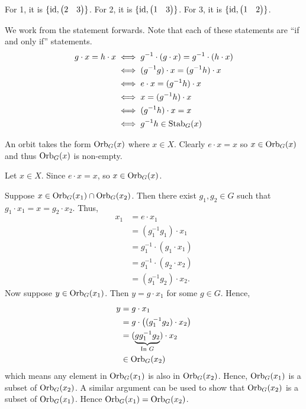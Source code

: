 \begin{questions}
    \item For 1, it is $\{\mathrm{id}, \begin{pmatrix}2 & 3\end{pmatrix}\}$. For 2, it is $\{\mathrm{id}, \begin{pmatrix}1 & 3\end{pmatrix}\}$. For 3, it is $\{\mathrm{id}, \begin{pmatrix}1 & 2\end{pmatrix}\}$.

    \item We work from the statement forwards. Note that each of these statements are ``if and only if'' statements.
    \begin{align*}
        g \cdot x = h \cdot x &\iff g^{-1} \cdot (g \cdot x) = g^{-1} \cdot (h \cdot x)\\
        &\iff (g^{-1}g) \cdot x = (g^{-1}h) \cdot x\\
        &\iff e \cdot x = (g^{-1}h) \cdot x\\
        &\iff x = (g^{-1}h) \cdot x\\
        &\iff (g^{-1}h) \cdot x = x\\
        &\iff g^{-1}h \in \mathrm{Stab}_{G}(x)
    \end{align*}

    \item \begin{partquestions}{\alph*}
        \item An orbit takes the form $\mathrm{Orb}_{G}(x)$ where $x \in X$. Clearly $e \cdot x = x$ so $x \in \mathrm{Orb}_{G}(x)$ and thus $\mathrm{Orb}_{G}(x)$ is non-empty.
        \item Let $x \in X$. Since $e \cdot x = x$, so $x \in \mathrm{Orb}_{G}(x)$.
        \item Suppose $x \in \mathrm{Orb}_{G}(x_1) \cap \mathrm{Orb}_{G}(x_2)$. Then there exist $g_1, g_2 \in G$ such that $g_1\cdot x_1 = x = g_2\cdot x_2$. Thus,
        \begin{align*}
            x_1 &= e \cdot x_1\\
            &= (g_1^{-1}g_1)\cdot x_1\\
            &= g_1^{-1} \cdot (g_1 \cdot x_1)\\
            &= g_1^{-1} \cdot (g_2 \cdot x_2)\\
            &= (g_1^{-1}g_2) \cdot x_2.
        \end{align*}
        Now suppose $y \in \mathrm{Orb}_{G}(x_1)$. Then $y = g\cdot x_1$ for some $g \in G$. Hence,
        \begin{align*}
            y &= g\cdot x_1 \\
            &= g \cdot \left((g_1^{-1}g_2) \cdot x_2\right)\\
            &= (\underbrace{gg_1^{-1}g_2}_{\text{In } G})\cdot x_2\\
            &\in \mathrm{Orb}_{G}(x_2)
        \end{align*}
        which means any element in $\mathrm{Orb}_{G}(x_1)$ is also in $\mathrm{Orb}_{G}(x_2)$. Hence, $\mathrm{Orb}_{G}(x_1)$ is a subset of $\mathrm{Orb}_{G}(x_2)$. A similar argument can be used to show that $\mathrm{Orb}_{G}(x_2)$ is a subset of $\mathrm{Orb}_{G}(x_1)$. Hence $\mathrm{Orb}_{G}(x_1) = \mathrm{Orb}_{G}(x_2)$.
    \end{partquestions}


\end{questions}
